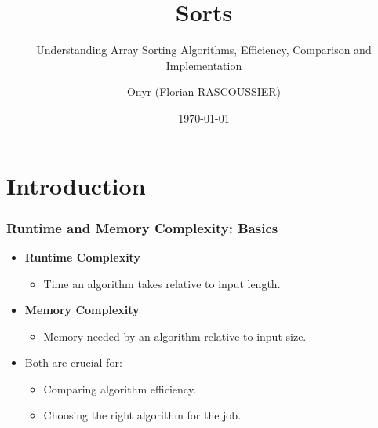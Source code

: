 \documentclass[compress,12pt]{beamer}
\title{Sorts}
\subtitle{Understanding Array Sorting Algorithms, Efficiency, Comparison and Implementation}
\date{\today}
\author{Onyr (Florian RASCOUSSIER)}
\institute{INSA Lyon \& IMT Atlantique}
\begin{document}
\frame[plain]{\titlepage}

\section{Introduction}

\begin{frame}
    \frametitle{Runtime and Memory Complexity: Basics}

    \begin{itemize}
          \item \textbf{Runtime Complexity}
                \begin{itemize}
                      \item Time an algorithm takes relative to input length.
                \end{itemize}
          \item \textbf{Memory Complexity}
                \begin{itemize}
                      \item Memory needed by an algorithm relative to input size.
                \end{itemize}
          \item Both are crucial for:
                \begin{itemize}
                      \item Comparing algorithm efficiency.
                      \item Choosing the right algorithm for the job.
                \end{itemize}
    \end{itemize}
\end{frame}
\end{document}
